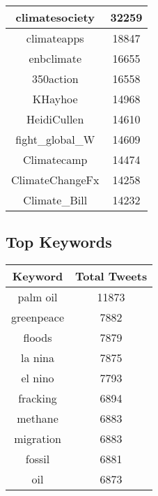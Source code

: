 \documentclass{article}\usepackage[T1]{fontenc}
\begin{document}
\begin{tabular}{|c|c|}
 \hline
climatesociety & 32259\\ 
 \hline
climateapps & 18847\\ 
 \hline
enbclimate & 16655\\ 
 \hline
350action & 16558\\ 
 \hline
KHayhoe & 14968\\ 
 \hline
HeidiCullen & 14610\\ 
 \hline
fight\_global\_W & 14609\\ 
 \hline
Climatecamp & 14474\\ 
 \hline
ClimateChangeFx & 14258\\ 
 \hline
Climate\_Bill & 14232\\ 
 \hline
\end{tabular}\subsection*{Top Keywords}\begin{tabular}{|c|c|}         \hline         Keyword & Total Tweets \\ 
 \hline
palm oil & 11873\\ 
 \hline
greenpeace & 7882\\ 
 \hline
floods & 7879\\ 
 \hline
la nina & 7875\\ 
 \hline
el nino & 7793\\ 
 \hline
fracking & 6894\\ 
 \hline
methane & 6883\\ 
 \hline
migration & 6883\\ 
 \hline
fossil & 6881\\ 
 \hline
oil & 6873\\ 
 \hline
\end{tabular}
\end{document}
